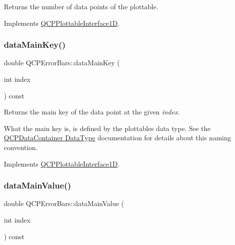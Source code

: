 Returns the number of data points of the plottable. 

Implements \hyperlink{class_q_c_p_plottable_interface1_d_a058a22c770ef4d5a0e878a7f02183da9}{Q\+C\+P\+Plottable\+Interface1D}.

\mbox{\label{class_q_c_p_error_bars_ae3931213f76cd34a824c42c22a1dca74}} 
\subsubsection{\texorpdfstring{data\+Main\+Key()}{dataMainKey()}}
{\footnotesize\ttfamily double Q\+C\+P\+Error\+Bars\+::data\+Main\+Key (\begin{DoxyParamCaption}\item[{int}]{index }\end{DoxyParamCaption}) const\hspace{0.3cm}{\ttfamily [virtual]}}

Returns the main key of the data point at the given {\itshape index}.

What the main key is, is defined by the plottable\textquotesingle{}s data type. See the \hyperlink{class_q_c_p_data_container_qcpdatacontainer-datatype}{Q\+C\+P\+Data\+Container Data\+Type} documentation for details about this naming convention. 

Implements \hyperlink{class_q_c_p_plottable_interface1_d_a2bd60daaac046945fead558cbd83cf73}{Q\+C\+P\+Plottable\+Interface1D}.

\mbox{\label{class_q_c_p_error_bars_a88cd90280366b44c2159774bfb7c473a}} 
\subsubsection{\texorpdfstring{data\+Main\+Value()}{dataMainValue()}}
{\footnotesize\ttfamily double Q\+C\+P\+Error\+Bars\+::data\+Main\+Value (\begin{DoxyParamCaption}\item[{int}]{index }\end{DoxyParamCaption}) const\hspace{0.3cm}{\ttfamily [virtual]}}

